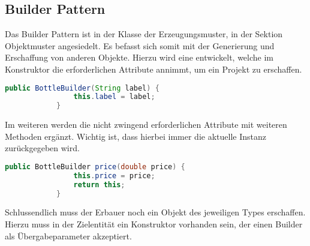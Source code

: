 		\subsection{Builder Pattern}
		Das Builder Pattern ist in der Klasse der Erzeugungsmuster, in der Sektion Objektmuster angesiedelt. Es befasst sich somit mit der Generierung und Erschaffung von anderen Objekte. Hierzu wird eine  entwickelt, welche im Konstruktor die erforderlichen Attribute annimmt, um ein Projekt zu erschaffen. 
		\begin{lstlisting}[language=java,caption={Beispiel eines Constructors des BottleBuildes},gobble=11]
			public BottleBuilder(String label) {
				this.label = label;
			}
		\end{lstlisting}
		Im weiteren werden die nicht zwingend erforderlichen Attribute mit weiteren Methoden ergänzt. Wichtig ist, dass hierbei immer die aktuelle Instanz zurückgegeben wird.
		\begin{lstlisting}[language=java,caption={Beispiel einer Builder Methode},gobble=11]
			public BottleBuilder price(double price) {
				this.price = price;
				return this;
			}
		\end{lstlisting}
		Schlussendlich muss der Erbauer noch ein Objekt des jeweiligen Types erschaffen. Hierzu muss in der Zielentität ein Konstruktor vorhanden sein, der einen Builder als Übergabeparameter akzeptiert. 
		
		\newpage
		
